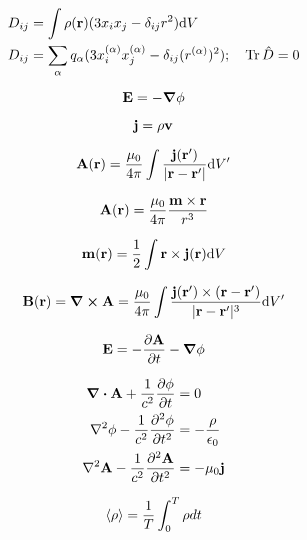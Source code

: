 \documentclass[11pt,twoside]{article}
\begin{document}
\begin{multicols}{3}
\begin{footnotesize}
\begin{equation}
\begin{split}
&D_{ij} = \int \rho(\vb{r})(3x_ix_j-\delta_{ij}r^2)\dd V \\
&D_{ij} = \sum_{\alpha} q_{\alpha} ( 3 x_i^{(\alpha)}x_j^{(\alpha)} - \delta_{ij}(r^{(\alpha)})^2); \quad \Tr\hat{D} =0
\end{split}
\end{equation}

\begin{equation}
\vb{E} = - \gradient \phi
\end{equation}

\begin{equation}
\vb{j} = \rho \vb{v}
\end{equation}

\begin{equation}
\vb{A}(\vb{r}) = \frac{\mu_0}{4\pi} \int \frac{\vb{j}(\vb{r'})}{|\vb{r}-\vb{r'}|}\dd V'
\end{equation}

\begin{equation}
\vb{A}(\vb{r}) = \frac{\mu_0}{4\pi} \frac{\vb{m}\times\vb{r}}{r^3}
\end{equation}

\begin{equation}
\vb{m}(\vb{r}) = \frac{1}{2} \int \vb{r} \times \vb{j}(\vb{r})\dd V
\end{equation}

\begin{equation}
\vb{B}(\vb{r}) = \curl \vb{A} = \frac{\mu_0}{4\pi} \int \frac{\vb{j}(\vb{r'})\times (\vb{r}-\vb{r'})}{|\vb{r}-\vb{r'}|^3} \dd V'
\end{equation}

\begin{equation}
\vb{E} = -\pdv{\vb{A}}{t} - \gradient \phi
\end{equation}

\begin{equation}
\begin{split}
\div{\vb{A}} + \frac{1}{c^2} \pdv{\phi}{t} &= 0 \\
\laplacian{\phi} - \frac{1}{c^2} \pdv[2]{\phi}{t} &= -\frac{\rho}{\epsilon_0} \\
\laplacian{\vb{A}} - \frac{1}{c^2} \pdv[2]{\vb{A}}{t} &= -\mu_0 \vb{j}
\end{split}
\end{equation}

\begin{equation}
\expval{\rho} = \frac{1}{T} \int_0^T \rho dt 
\end{equation}


\end{footnotesize}
\end{multicols}
\end{document}
